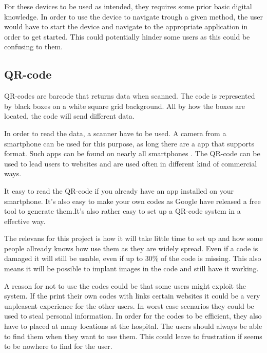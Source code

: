 For these devices to be used as intended, they requires some prior basic digital knowledge. In order to use the device to navigate trough a given method, the user would have to start the device and navigate to the appropriate application in order to get started. This could potentially hinder some users as this could be confusing to them.


\subsection{QR-code} %


QR-codes are barcode that returns data when scanned. The code is represented by black boxes on a white square grid background. All by how the boxes are located, the code will send different data.

In order to read the data, a scanner have to be used. A camera from a smartphone can be used for this purpose, as long there are a app that supports format. Such apps can be found on nearly all smartphones \cite{QR_smart}. The QR-code can be used to lead users to websites and are used often in different kind of commercial ways\cite{QR_url}.

It easy to read the QR-code if you already have an app installed on your smartphone. It's also easy to make your own codes as Google have released a free tool to generate them\cite{QR_Google}.It's also rather easy to set up a QR-code system in a effective way\cite{QR_easy}.

The relevans for this project is how it will take little time to set up\cite{QR_rel1} and how some people allready knows how use them as they are widely spread\cite{QR_spread}. Even if a code is damaged it will still be usable, even if up to 30\% of the code is missing\cite{QR_dama}. This also means it will be possible to implant images in the code and still have it working\cite{QR_image}.

A reason for not to use the codes could be that some users might exploit the system. If the print their own codes with links certain websites it could be a very unpleasent experience for the other users\cite{QR_urlbad}. In worst case scenarios they could be used to steal personal information\cite{QR_information}.
In order for the codes to be efficient, they also have to placed at many locations at the hospital. The users should always be able to find them when they want to use them. This could leave to frustration if seems to be nowhere to find for the user.

